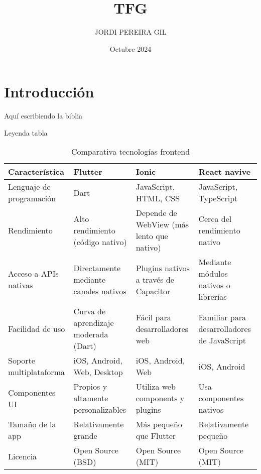 \documentclass{article}
\title{TFG}
\author{JORDI PEREIRA GIL}
\date{Octubre 2024}
\begin{document}
\maketitle

\section{Introducción}
Aquí escribiendo la biblia

\begin{table}
    \centering
    \caption{Leyenda tabla}
\scriptsize
\begin{tabular}{|p{3cm}|p{3cm}|p{3cm}|p{3cm}|} \hline 
         \textbf{Característica}&  \textbf{Flutter}&  \textbf{Ionic}& \textbf{React navive}\\ \hline 
         Lenguaje de programación&  Dart&  JavaScript, HTML, CSS& JavaScript, TypeScript\\ \hline 
         Rendimiento&  Alto rendimiento (código nativo)&  Depende de WebView (más lento que nativo)& Cerca del rendimiento nativo\\ \hline 
         Acceso a APIs nativas&  Directamente mediante canales nativos&  Plugins nativos a través de Capacitor& Mediante módulos nativos o librerías\\ \hline 
         Facilidad de uso&  Curva de aprendizaje moderada (Dart)&  Fácil para desarrolladores web& Familiar para desarrolladores de JavaScript\\ \hline 
         Soporte multiplataforma&  iOS, Android, Web, Desktop&  iOS, Android, Web& iOS, Android\\ \hline 
         Componentes UI&  Propios y altamente personalizables&  Utiliza web components y plugins& Usa componentes nativos\\ \hline 
         Tamaño de la app&  Relativamente grande&  Más pequeño que Flutter& Relativamente pequeño\\ \hline 
         Licencia&  Open Source (BSD)&  Open Source (MIT)& Open Source (MIT)\\ \hline
    \end{tabular}
\caption{Comparativa tecnologías frontend}
\label{tab:my_table}
    
    
\end{table}




\end{document}
